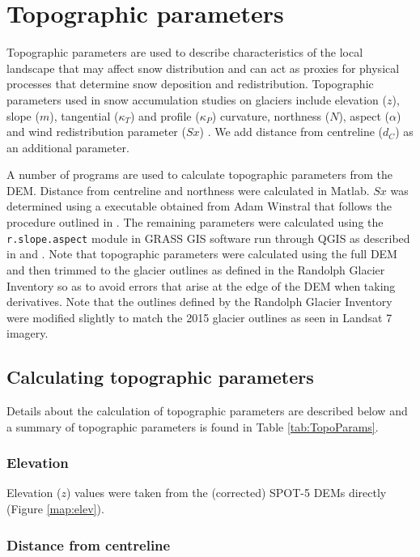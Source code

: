 \documentclass{sfuthesis}
\begin{document}
\section{Topographic parameters}
\label{sec:topoCalc}

Topographic parameters are used to describe characteristics of the local landscape that may affect snow distribution and can act as proxies for physical processes that determine snow deposition and redistribution. Topographic parameters used in snow accumulation studies on glaciers include elevation ($z$), slope ($m$), tangential ($\kappa_T$) and profile ($\kappa_P$) curvature, northness ($N$), aspect ($\alpha$) and wind redistribution parameter ($Sx$) \citep{Basist1994, Revuelto2014, McGrath2015}.	We add distance from centreline ($d_C$) as an additional parameter.
 
A number of programs are used to calculate topographic parameters from the DEM. Distance from centreline and northness were calculated in Matlab. $Sx$ was determined using a executable obtained from Adam Winstral that follows the procedure outlined in \cite{Winstral2002}. The remaining parameters were calculated using the \texttt{r.slope.aspect} module in GRASS GIS software run through QGIS as described in \cite{Mitavsova1993} and \cite{Hofierka2009}. Note that topographic parameters were calculated using the full DEM and then trimmed to the glacier outlines as defined in the Randolph Glacier Inventory so as to avoid errors that arise at the edge of the DEM when taking derivatives. Note that the outlines defined by the Randolph Glacier Inventory were modified slightly to match the 2015 glacier outlines as seen in Landsat 7 imagery.

\subsection{Calculating topographic parameters}

Details about the calculation of topographic parameters are described below and a summary of topographic parameters is found in Table \ref{tab:TopoParams}.
\subsubsection*{Elevation}

Elevation ($z$) values were taken from the (corrected) SPOT-5 DEMs directly (Figure \ref{map:elev}).

\subsubsection*{Distance from centreline}
\end{document}
